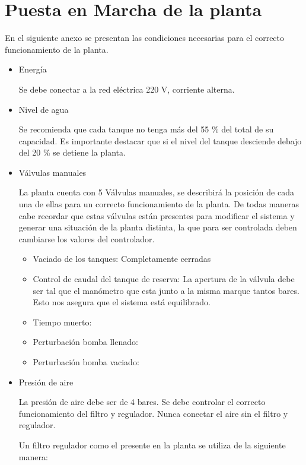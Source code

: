 \section{Puesta en Marcha de la planta}
\label{anexo:puestaEnMarcha}

En el siguiente anexo se presentan las condiciones necesarias para el
correcto funcionamiento de la planta.

\begin{itemize}
 \item Energía
 
 Se debe conectar a la red eléctrica 220 V, corriente alterna.
 
 \item Nivel de agua
 
 Se recomienda que cada tanque no tenga más del 55 \% del total de su 
 capacidad. Es importante destacar que si el nivel del tanque desciende
 debajo del 20 \% se detiene la planta. 
 
 \item Válvulas manuales
 
 La planta cuenta con 5 Válvulas manuales, se describirá la posición de 
 cada una de ellas para un correcto funcionamiento de la planta. De todas
 maneras cabe recordar que estas válvulas están presentes para modificar el 
 sistema y generar una situación de la planta distinta, la que para ser 
 controlada deben cambiarse los valores del controlador.
 
 \begin{itemize}
  \item Vaciado de los tanques: Completamente cerradas
  \item Control de caudal del tanque de reserva:
  La apertura de la válvula debe ser tal que el manómetro que esta junto
  a la misma marque tantos bares. Esto nos asegura que el sistema está 
  equilibrado.
  \item Tiempo muerto:
  \item Perturbación bomba llenado:
  \item Perturbación bomba vaciado:
 \end{itemize}

 \item Presión de aire
 
 La presión de aire debe ser de 4 bares. Se debe controlar el correcto 
 funcionamiento del filtro y regulador. Nunca conectar el aire sin el filtro y 
 regulador.
 
 Un filtro regulador como el presente en la planta se utiliza de la siguiente manera:
 

\end{itemize}
